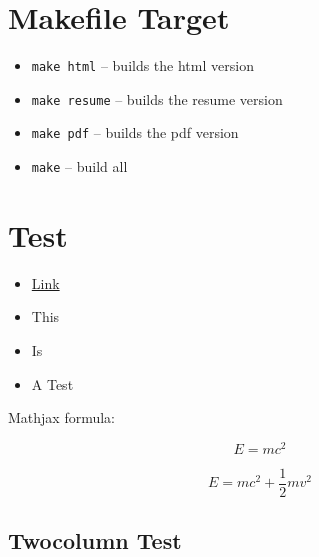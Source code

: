 \section{Makefile Target}
\label{sec-11}

\begin{itemize}
\item \texttt{make html} -- builds the html version
\item \texttt{make resume} -- builds the resume version
\item \texttt{make pdf} -- builds the pdf version
\item \texttt{make} -- build all
\end{itemize}

\section{Test}
\label{sec-12}

\begin{itemize}
\item \href{http://www.google.com}{Link}
\item This
\item Is
\item A Test
\end{itemize}

Mathjax formula:

\[
 E=mc^2
\]

\begin{equation}
 E=mc^2 + \frac{1}{2} mv^2
\end{equation}

\subsection{Twocolumn Test}
\label{sec-12-1}

